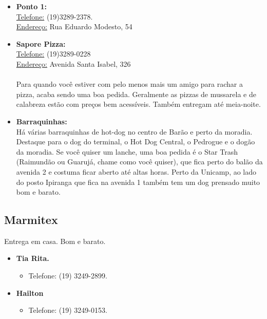 \begin{itemize}
\item  \textbf{Ponto 1:}
\\\underline{Telefone:} (19)3289-2378.
\\\underline{Endereço:} Rua Eduardo Modesto, 54
\end{itemize}

\begin{itemize}
\item  \textbf{Sapore Pizza:}
\\\underline{Telefone:} (19)3289-0228
\\\underline{Endereço:} Avenida Santa Isabel, 326
\\\\Para quando você estiver com pelo menos mais um amigo para rachar a pizza, acaba sendo uma boa pedida. Geralmente as pizzas de mussarela e de calabreza estão com preços bem acessíveis. Também entregam até meia-noite.
\end{itemize}

\begin{itemize}
\item  \textbf{Barraquinhas:}
\\Há várias barraquinhas de hot-dog no centro de Barão e perto da moradia. Destaque para o dog do terminal, o Hot Dog Central, o Pedrogue e o dogão da moradia. Se você quiser um lanche, uma boa pedida é o Star Trash (Raimundão ou Guarujá, chame como você quiser), que fica perto do balão da avenida 2 e costuma ficar aberto até altas horas. Perto da Unicamp, ao lado do posto Ipiranga que fica na avenida 1 também tem um dog prensado muito bom e barato.
\end{itemize}

\subsection{Marmitex}

Entrega em casa. Bom e barato.

\begin{itemize}
\item  \textbf{Tia Rita.}
\begin{itemize}
\item  Telefone: (19) 3249-2899.
\end{itemize}
\end{itemize}

\begin{itemize}
\item  \textbf{Hailton}
\begin{itemize}
\item  Telefone: (19) 3249-0153.
\end{itemize}
\end{itemize}

